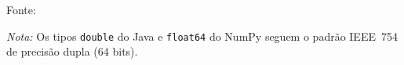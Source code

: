 \begin{quadro}[ht]
\begin{center}
\begin{threeparttable}
\begin{tabularx}{\textwidth}{|>{\raggedright\arraybackslash}X|>{\raggedright\arraybackslash}X|}
\end{tabularx}
\begin{tablenotes}[flushleft]
\footnotesize
\item Fonte:~\oautor
\item \textit{Nota:} Os tipos \texttt{double} do Java e \texttt{float64} do NumPy seguem o padrão IEEE~754 de precisão dupla (64 bits).
\end{tablenotes}
\end{threeparttable}
\end{center}
\end{quadro}
